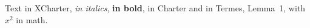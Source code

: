 \documentclass{article}
\begin{document}
Text in XCharter, \emph{in italics}, \textbf{in bold},
{\selectfont in Charter} and {\selectfont in Termes, Lemma~1},
with $x^2$ in math.
\end{document}
